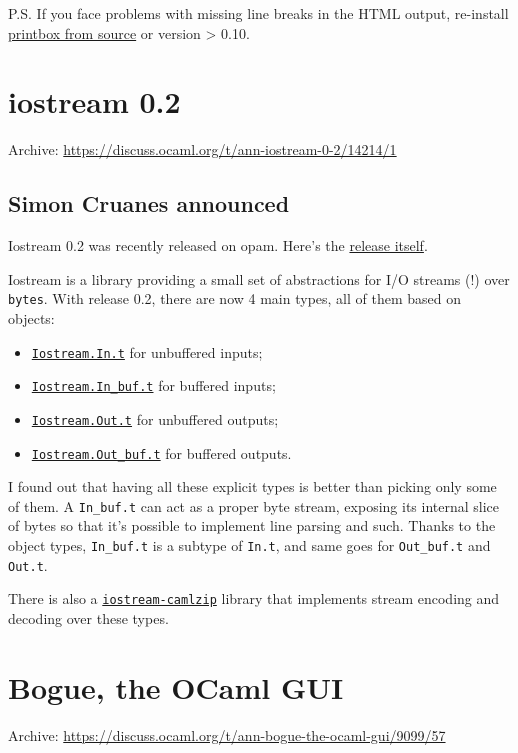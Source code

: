 \documentclass[11pt]{article}
\begin{document}
P.S. If you face problems with missing line breaks in the HTML output, re-install \href{https://github.com/c-cube/printbox}{printbox from
source} or version > 0.10.
\section*{iostream 0.2}
\label{7}
Archive: \url{https://discuss.ocaml.org/t/ann-iostream-0-2/14214/1}
\subsection*{Simon Cruanes announced}
\label{sec:org3bc182a}


Iostream 0.2 was recently released on opam. Here's the \href{https://github.com/c-cube/ocaml-iostream/releases/tag/v0.2}{release itself}.

Iostream is a library providing a small set of abstractions for I/O streams (!) over \texttt{bytes}. With release 0.2, there are now 4 main
types, all of them based on objects:
\begin{itemize}
\item \href{https://c-cube.github.io/ocaml-iostream/iostream/Iostream/In/index.html}{\texttt{Iostream.In.t}} for unbuffered inputs;
\item \href{https://c-cube.github.io/ocaml-iostream/iostream/Iostream/In\_buf/index.html}{\texttt{Iostream.In\_buf.t}} for buffered inputs;
\item \href{https://c-cube.github.io/ocaml-iostream/iostream/Iostream/Out/index.html}{\texttt{Iostream.Out.t}} for unbuffered outputs;
\item \href{https://c-cube.github.io/ocaml-iostream/iostream/Iostream/Out\_buf/index.html}{\texttt{Iostream.Out\_buf.t}} for buffered outputs.
\end{itemize}

I found out that having all these explicit types is better than picking only some of them. A \texttt{In\_buf.t} can act as a proper byte
stream, exposing its internal slice of bytes so that it's possible to implement line parsing and such. Thanks to the object types,
\texttt{In\_buf.t} is a subtype of \texttt{In.t}, and same goes for \texttt{Out\_buf.t} and \texttt{Out.t}.

There is also a \href{https://c-cube.github.io/ocaml-iostream/iostream-camlzip/Iostream\_camlzip/index.html}{\texttt{iostream-camlzip}} library
that implements stream encoding and decoding over these types.
\section*{Bogue, the OCaml GUI}
\label{8}
Archive: \url{https://discuss.ocaml.org/t/ann-bogue-the-ocaml-gui/9099/57}
\end{document}
